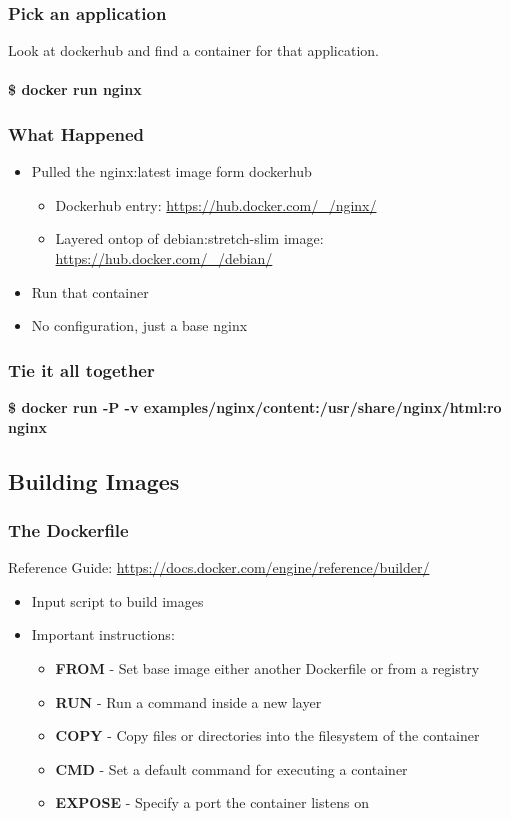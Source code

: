 \documentclass[aspectratio=169,11pt,hyperref={colorlinks=true}]{beamer}
\begin{document}
\begin{frame}
    \frametitle{Pick an application}
    Look at dockerhub and find a container for that application. \\ \\
    {\LARGE \textbf{\$ docker run nginx}}
\end{frame}

\begin{frame}
    \frametitle{What Happened}
    \begin{itemize}
        \item Pulled the nginx:latest image form dockerhub
            \begin{itemize}
                \item Dockerhub entry: \href{https://hub.docker.com/\_/nginx/}{https://hub.docker.com/\_/nginx/}
                \item Layered ontop of debian:stretch-slim image: \href{https://hub.docker.com/\_/debian/}{https://hub.docker.com/\_/debian/}
            \end{itemize}
        \item Run that container
        \item No configuration, just a base nginx
    \end{itemize}
\end{frame}

\begin{frame}
    \frametitle{Tie it all together}
    \textbf{\$ docker run -P -v examples/nginx/content:/usr/share/nginx/html:ro nginx}
\end{frame}

\subsection{Building Images}
\begin{frame}
    \frametitle{The Dockerfile}
    Reference Guide: \href{https://docs.docker.com/engine/reference/builder/}{https://docs.docker.com/engine/reference/builder/}
    \begin{itemize}
        \item Input script to build images
        \item Important instructions:
        \begin{itemize}
            \item \textbf{FROM} - Set base image either another Dockerfile or from a registry
            \item \textbf{RUN} - Run a command inside a new layer
            \item \textbf{COPY} - Copy files or directories into the filesystem of the container
            \item \textbf{CMD} - Set a default command for executing a container
            \item \textbf{EXPOSE} - Specify a port the container listens on
        \end{itemize}
    \end{itemize}
\end{frame}
\end{document}

